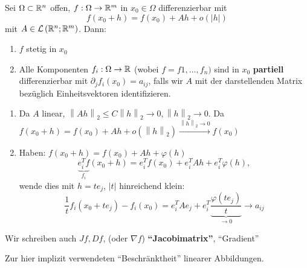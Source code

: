 \begin{theorem}
	Sei $ \Omega \subset \mathbb{R} ^n $ offen, $ f : \Omega \to \mathbb{R} ^m $ in $ x_0 \in \Omega $ differenzierbar mit
	\[
		f (x_0 + h) = f(x_0) + Ah + o\left( \left| h \right|  \right) 
	\]
	mit $ A \in \mathcal{L} \left( \mathbb{R} ^n; \mathbb{R} ^m \right)  $.
	Dann:
	\begin{enumerate}[label=(\roman*)]
		\item $ f $ stetig in $ x_0 $ 
		\item Alle Komponenten $ f_i : \Omega \to \mathbb{R}  $ (wobei $ f = f1, \ldots, f_n) $
		sind in $ x_0 $ \textbf{partiell} differenzierbar mit $ \partial_j f_i (x_0) = a_{ij}  $, falls wir $ A $ mit der darstellenden Matrix bezüglich Einheitsvektoren identifizieren.
	\end{enumerate}
\end{theorem}
\begin{proof*}
	\begin{enumerate}[label=(\roman*)]
		\item Da $ A $ linear, $ \left\| A h \right\|_2 \leq C \left\| h \right\| _2 \to 0, \left\| h \right\| _2 \to 0 $.
			Da $ f(x_0 + h) = f(x_0) + Ah + o\left( \left\| h \right\| _2 \right) \overset{\left\| h \right\| _2 \to 0}{\longrightarrow} f(x_0) $
		\item Haben: $ f(x_0 + h) = f(x_0) + Ah + \varphi(h) $ 
			\[
				\underbrace{e_i^Tf}_{f_i}(x_0 + h) = e_i^T f(x_0) + e_i^T Ah + e_i^T \varphi(h),
			\]
			wende dies mit $ h = te_j $, $ \left| t \right|  $ hinreichend klein:
			\[
				\frac{ 1 }{ t } f_i(x_0 + te_j) - f_i(x_0) = e_i^T A e_j + e_i^T \underbrace{\frac{ \varphi (t e_j )}{ t } }_{\to 0} \to a_{ij} 
			\]
	\end{enumerate}
\end{proof*}

\begin{note*}
	Wir schreiben auch $ Jf, Df $, (oder $ \nabla f $) \textbf{``Jacobimatrix''}, ``Gradient''
\end{note*}

Zur hier implizit verwendeten ``Beschränktheit'' linearer Abbildungen.

